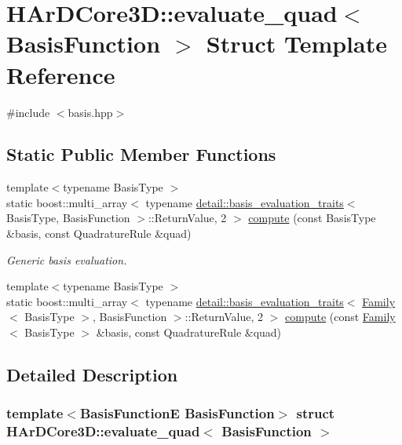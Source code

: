 \hypertarget{structHArDCore3D_1_1evaluate__quad}{}\section{H\+Ar\+D\+Core3D\+:\+:evaluate\+\_\+quad$<$ Basis\+Function $>$ Struct Template Reference}
\label{structHArDCore3D_1_1evaluate__quad}


{\ttfamily \#include $<$basis.\+hpp$>$}

\subsection*{Static Public Member Functions}
\begin{DoxyCompactItemize}
\item 
{\footnotesize template$<$typename Basis\+Type $>$ }\\static boost\+::multi\+\_\+array$<$ typename \hyperlink{structHArDCore3D_1_1detail_1_1basis__evaluation__traits}{detail\+::basis\+\_\+evaluation\+\_\+traits}$<$ Basis\+Type, Basis\+Function $>$\+::Return\+Value, 2 $>$ \hyperlink{structHArDCore3D_1_1evaluate__quad_a1abe06df2a8a25ad4de2f738930ec143}{compute} (const Basis\+Type \&basis, const Quadrature\+Rule \&quad)
\begin{DoxyCompactList}\small\item\em Generic basis evaluation. \end{DoxyCompactList}\item 
{\footnotesize template$<$typename Basis\+Type $>$ }\\static boost\+::multi\+\_\+array$<$ typename \hyperlink{structHArDCore3D_1_1detail_1_1basis__evaluation__traits}{detail\+::basis\+\_\+evaluation\+\_\+traits}$<$ \hyperlink{classHArDCore3D_1_1Family}{Family}$<$ Basis\+Type $>$, Basis\+Function $>$\+::Return\+Value, 2 $>$ \hyperlink{structHArDCore3D_1_1evaluate__quad_aa1df24802a0b4781d1c7e8203f772a52}{compute} (const \hyperlink{classHArDCore3D_1_1Family}{Family}$<$ Basis\+Type $>$ \&basis, const Quadrature\+Rule \&quad)
\end{DoxyCompactItemize}


\subsection{Detailed Description}
\subsubsection*{template$<$Basis\+FunctionE Basis\+Function$>$\newline
struct H\+Ar\+D\+Core3\+D\+::evaluate\+\_\+quad$<$ Basis\+Function $>$}


